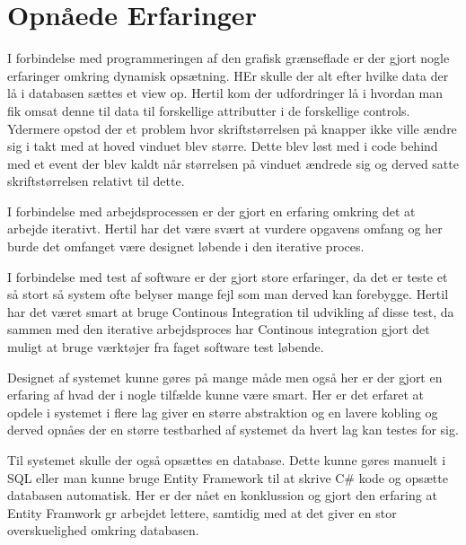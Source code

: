 \section{Opnåede Erfaringer}
I forbindelse med programmeringen af den grafisk grænseflade er der gjort nogle erfaringer omkring dynamisk opsætning.
HEr skulle der alt efter hvilke data der lå i databasen sættes et view op. Hertil kom der udfordringer lå i hvordan
man fik omsat denne til data til forskellige attributter i de forskellige controls. Ydermere opstod der et problem 
hvor skriftstørrelsen på knapper ikke ville ændre sig i takt med at hoved vinduet blev større. Dette blev løst med
i code behind med et event der blev kaldt når størrelsen på vinduet ændrede sig og derved satte skriftstørrelsen relativt 
til dette.

I forbindelse med arbejdsprocessen er der gjort en erfaring omkring det at arbejde iterativt. Hertil har det være svært at vurdere
opgavens omfang og her burde det omfanget være designet løbende i den iterative proces. 

I forbindelse med test af software er der gjort store erfaringer, da det er teste et så stort så system ofte belyser mange fejl
som man derved kan forebygge. Hertil har det været smart at bruge Continous Integration til udvikling af disse test, da sammen
med den iterative arbejdsproces har Continous integration gjort det muligt at bruge værktøjer fra faget software test løbende. 

Designet af systemet kunne gøres på mange måde men også her er der gjort en erfaring af hvad der i nogle tilfælde kunne være smart. 
Her er det erfaret at opdele i systemet i flere lag giver en større abstraktion og en lavere kobling og derved opnåes der en større 
testbarhed af systemet da hvert lag kan testes for sig. 

Til systemet skulle der også opsættes en database. Dette kunne gøres manuelt i SQL eller man kunne bruge Entity Framework til at skrive 
C# kode og opsætte databasen automatisk. Her er der nået en konklussion og gjort den erfaring at Entity Framwork gr arbejdet lettere, samtidig med
at det giver en stor overskuelighed omkring databasen. 

